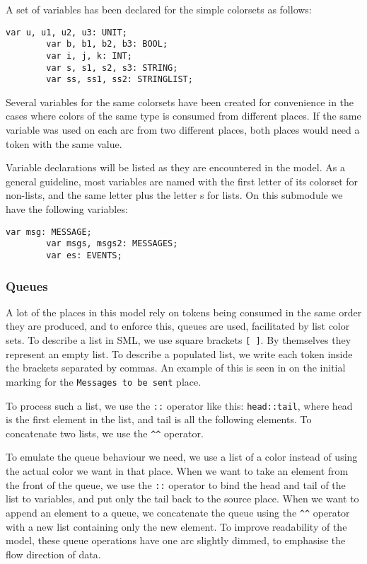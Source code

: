 		A set of variables has been declared for the simple colorsets as follows:
		
		\begin{lstlisting}[label=lst:standard_vars,caption=Simple Colorset Variables]
		var u, u1, u2, u3: UNIT;
		var b, b1, b2, b3: BOOL;
		var i, j, k: INT;
		var s, s1, s2, s3: STRING;
		var ss, ss1, ss2: STRINGLIST;
		\end{lstlisting}
		
		Several variables for the same colorsets have been created for convenience in
		the cases where colors of the same type is consumed from different places. If the same variable was
		used on each arc from two different places, both places would need a token
		with the same value. 
		
		Variable declarations will be listed as they are encountered in the model.
		As a general guideline, most variables are named with the first letter of its
		colorset for non-lists, and the same letter plus the letter s for lists. On
		this submodule we have the following variables:
		
		\begin{lstlisting}[label=lst:client_app_vars,caption=Client Application
		Variables]
		var msg: MESSAGE;
		var msgs, msgs2: MESSAGES;
		var es: EVENTS;
		\end{lstlisting}
	
	\subsubsection{Queues}
	
		A lot of the places in this model rely on tokens being consumed in the same
		order they are produced, and to enforce this, queues are used, facilitated
		by list color sets. To describe a list in SML, we use square
		brackets \lstinline:[ ]:. By themselves they represent an empty list. To describe a populated list, we
		write each token inside the brackets separated by commas. An example of this
		is seen in  on the initial marking for the
		\lstinline:Messages to be sent: place.
		
		To process such a list, we use the \lstinline-::- operator like this:
		\lstinline-head::tail-, where head is the first element in the list, and tail
		is all the following elements. To concatenate two lists, we use the
		\lstinline:^^: operator. 
		
		To emulate the queue behaviour we need, we use a list of a color instead of
		using the actual color we want in that place. When we want to take an
		element from the front of the queue, we use the \lstinline-::- operator to
		bind the head and tail of the list to variables, and put only the tail back to
		the source place. When we want to append an element to a queue, we concatenate
		the queue using the \lstinline:^^: operator with a new list containing only
		the new element. To improve readability of the model, these queue operations
		have one arc slightly dimmed, to emphasise the flow direction of data.
		
